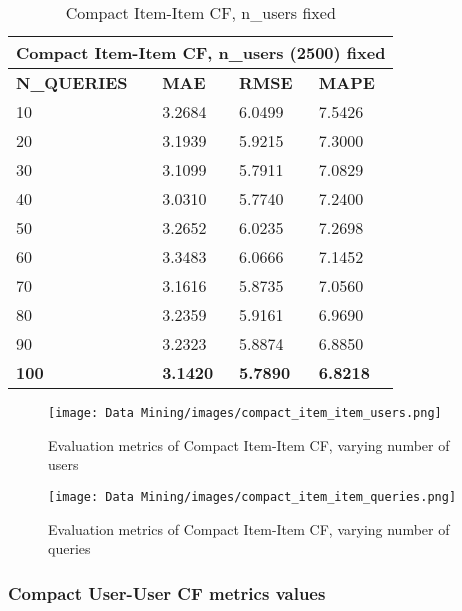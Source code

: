 \begin{table}[h!]
    \centering
    \begin{tabular}{ |p{2cm}||p{1.5cm}|p{1.5cm}|p{1.5cm}|  }
         \hline
         \multicolumn{4}{|c|}{Compact Item-Item CF, n\_users (2500) fixed } \\
         \hline
         \textbf{N\_QUERIES}& \textbf{MAE} &\textbf{RMSE} &\textbf{MAPE}\\
         \hline
         10 & 3.2684 & 6.0499 & 7.5426\\
         20 & 3.1939 & 5.9215 & 7.3000\\
         30 & 3.1099 & 5.7911 & 7.0829\\
         40 & 3.0310 & 5.7740 & 7.2400\\
         50 & 3.2652 & 6.0235 & 7.2698\\
         60 & 3.3483 & 6.0666 & 7.1452\\
         70 & 3.1616 & 5.8735 & 7.0560\\
         80 & 3.2359 & 5.9161 & 6.9690\\
         90 & 3.2323 & 5.8874 & 6.8850\\
         \textbf{100}& \textbf{3.1420} & \textbf{5.7890} & \textbf{6.8218}\\
         
         \hline
    \end{tabular}
    \caption{Compact Item-Item CF, n\_users fixed}
    \label{tab:compact Item-Item CF, nusers fixed}
\end{table}

\begin{figure}[h!]
\centering
\texttt{[image: Data Mining/images/compact\_item\_item\_users.png]}
\caption{Evaluation metrics of Compact Item-Item CF, varying number of users}
\label{fig:Compact Item-Item CF, varying users}
\end{figure}

\begin{figure}[h!]
\centering
\texttt{[image: Data Mining/images/compact\_item\_item\_queries.png]}
\caption{Evaluation metrics of Compact Item-Item CF, varying number of queries}
\label{fig:Compact Item-Item CF, varying queries}
\end{figure}




\subsubsection{Compact User-User CF metrics values}
\label{sec:compact-user-user-metrics}

